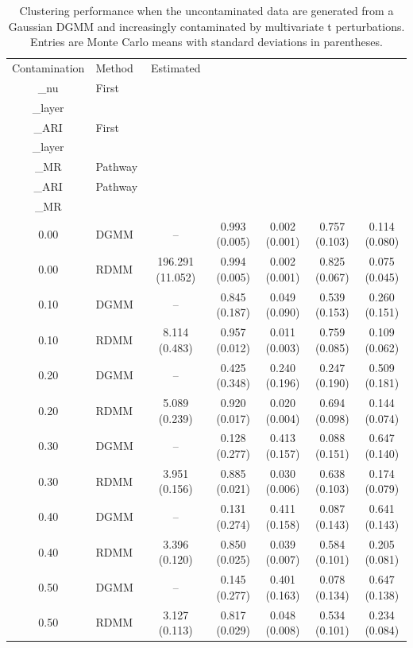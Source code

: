\begin{table}[!ht]
\centering
\caption{Clustering performance when the uncontaminated data are generated from a Gaussian DGMM and increasingly contaminated by multivariate t perturbations. Entries are Monte Carlo means with standard deviations in parentheses.}
\label{tab:gaussian-contamination}
\begin{tabular}{c l c c c c c}
\hline
Contamination & Method & Estimated\\_nu & First\\_layer\\_ARI & First\\_layer\\_MR & Pathway\\_ARI & Pathway\\_MR \\
\hline
0.00 & DGMM & -- & 0.993 (0.005) & 0.002 (0.001) & 0.757 (0.103) & 0.114 (0.080) \\
0.00 & RDMM & 196.291 (11.052) & 0.994 (0.005) & 0.002 (0.001) & 0.825 (0.067) & 0.075 (0.045) \\
0.10 & DGMM & -- & 0.845 (0.187) & 0.049 (0.090) & 0.539 (0.153) & 0.260 (0.151) \\
0.10 & RDMM & 8.114 (0.483) & 0.957 (0.012) & 0.011 (0.003) & 0.759 (0.085) & 0.109 (0.062) \\
0.20 & DGMM & -- & 0.425 (0.348) & 0.240 (0.196) & 0.247 (0.190) & 0.509 (0.181) \\
0.20 & RDMM & 5.089 (0.239) & 0.920 (0.017) & 0.020 (0.004) & 0.694 (0.098) & 0.144 (0.074) \\
0.30 & DGMM & -- & 0.128 (0.277) & 0.413 (0.157) & 0.088 (0.151) & 0.647 (0.140) \\
0.30 & RDMM & 3.951 (0.156) & 0.885 (0.021) & 0.030 (0.006) & 0.638 (0.103) & 0.174 (0.079) \\
0.40 & DGMM & -- & 0.131 (0.274) & 0.411 (0.158) & 0.087 (0.143) & 0.641 (0.143) \\
0.40 & RDMM & 3.396 (0.120) & 0.850 (0.025) & 0.039 (0.007) & 0.584 (0.101) & 0.205 (0.081) \\
0.50 & DGMM & -- & 0.145 (0.277) & 0.401 (0.163) & 0.078 (0.134) & 0.647 (0.138) \\
0.50 & RDMM & 3.127 (0.113) & 0.817 (0.029) & 0.048 (0.008) & 0.534 (0.101) & 0.234 (0.084) \\
\hline
\end{tabular}
\end{table}
